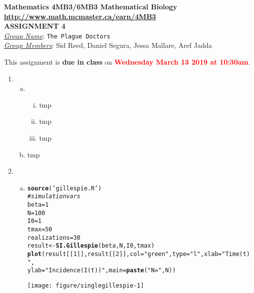\documentclass[12pt]{article}\usepackage[]{graphicx}\usepackage[]{color}
\makeatletter
\def\maxwidth{ %
  \ifdim\Gin@nat@width>\linewidth
    \linewidth
  \else
    \Gin@nat@width
  \fi
}
\newcommand{\hlnum}[1]{\textcolor[rgb]{0.686,0.059,0.569}{#1}}%
\newcommand{\hlstr}[1]{\textcolor[rgb]{0.192,0.494,0.8}{#1}}%
\newcommand{\hlcom}[1]{\textcolor[rgb]{0.678,0.584,0.686}{\textit{#1}}}%
\newcommand{\hlstd}[1]{\textcolor[rgb]{0.345,0.345,0.345}{#1}}%
\newcommand{\hlkwb}[1]{\textcolor[rgb]{0.69,0.353,0.396}{#1}}%
\newcommand{\hlkwc}[1]{\textcolor[rgb]{0.333,0.667,0.333}{#1}}%
\newcommand{\hlkwd}[1]{\textcolor[rgb]{0.737,0.353,0.396}{\textbf{#1}}}%
\newenvironment{kframe}{%
 \def\at@end@of@kframe{}%
 \ifinner\ifhmode%
  \def\at@end@of@kframe{\end{minipage}}%
  \begin{minipage}{\columnwidth}%
 \fi\fi%
 \def\FrameCommand##1{\hskip\@totalleftmargin \hskip-\fboxsep
 \colorbox{shadecolor}{##1}\hskip-\fboxsep
     \hskip-\linewidth \hskip-\@totalleftmargin \hskip\columnwidth}%
 \MakeFramed {\advance\hsize-\width
   \@totalleftmargin\z@ \linewidth\hsize
   \@setminipage}}%
 {\par\unskip\endMakeFramed%
 \at@end@of@kframe}
\newenvironment{knitrout}{}{} %
\makeatother
\begin{document}
\begin{center}
{\bf Mathematics 4MB3/6MB3 Mathematical Biology\\
\smallskip
\url{http://www.math.mcmaster.ca/earn/4MB3}\\
 ASSIGNMENT 4}\\
\medskip
\underline{\emph{Group Name}}: \texttt{{\color{blue}The Plague Doctors}}\\
\medskip
\underline{\emph{Group Members}}: {\color{blue}Sid Reed, Daniel Segura, Jessa Mallare, Aref Jadda}
\end{center}

\bigskip
\noindent
This assignment is {\bfseries\color{red} due in class} on \textcolor{red}{\bf Wednesday March 13 2019 at 10:30am}.
\bigskip
\begin{enumerate}
    \item %
    \begin{enumerate}[(a)]
        \item \TSa
        \begin{enumerate}[(i)]
            \item


tmp

            \item


tmp
            \item


tmp


        \end{enumerate}
        \item \TSb


tmp
    \end{enumerate}
    \item \SEintro
    \begin{enumerate}[(a)]
        \item

\begin{knitrout}
\color{fgcolor}\begin{kframe}
\begin{alltt}
\hlkwd{source}\hlstd{(}\hlstr{'gillespie.R'}\hlstd{)}
\hlcom{#simulation vars}
\hlstd{beta} \hlkwb{=} \hlnum{1}
\hlstd{N} \hlkwb{=} \hlnum{100}
\hlstd{I0} \hlkwb{=} \hlnum{1}
\hlstd{tmax} \hlkwb{=} \hlnum{50}
\hlstd{realizations} \hlkwb{=} \hlnum{30}
\hlstd{result} \hlkwb{<-} \hlkwd{SI.Gillespie}\hlstd{(beta,N,I0,tmax)}
\hlkwd{plot}\hlstd{(result[[}\hlnum{1}\hlstd{]], result[[}\hlnum{2}\hlstd{]],} \hlkwc{col}\hlstd{=}\hlstr{"green"}\hlstd{,} \hlkwc{type}\hlstd{=}\hlstr{"l"}\hlstd{,} \hlkwc{xlab}\hlstd{=}\hlstr{"Time (t)"}\hlstd{,}
     \hlkwc{ylab}\hlstd{=}\hlstr{"Incidence (I(t))"}\hlstd{,} \hlkwc{main}\hlstd{=}\hlkwd{paste}\hlstd{(}\hlstr{"N ="}\hlstd{,N))}
\end{alltt}
\end{kframe}
\texttt{[image: figure/singlegillespie-1]} 


\end{knitrout}
\end{enumerate}
\end{enumerate}
\end{document}

